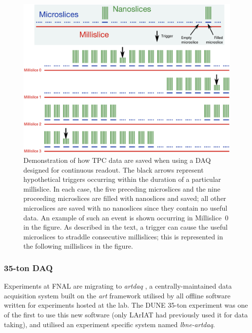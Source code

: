 \begin{figure}
  \centering
  \includegraphics[width=16cm]{triggered_event.eps}
  \caption[Demonstration of how TPC data from a triggered event in a LArTPC is saved when employing a DAQ with continuous readout.]{Demonstration of how TPC data are saved when using a DAQ designed for continuous readout.  The black arrows represent hypothetical triggers occurring within the duration of a particular millislice.  In each case, the five preceding microslices and the nine proceeding microslices are filled with nanoslices and saved; all other microslices are saved with no nanoslices since they contain no useful data.  An example of such an event is shown occurring in Millislice~0 in the figure.  As described in the text, a trigger can cause the useful microslices to straddle consecutive millislices; this is represented in the following millislices in the figure.}
  \label{fig:35tonTriggeredEvent}
\end{figure}

\subsubsection{35-ton DAQ}\label{sec:35tonDAQ}

Experiments at FNAL are migrating to \textit{artdaq} \cite{Biery2013}, a centrally-maintained data acquisition system built on the \textit{art} \cite{artWebsite,art2012} framework utilised by all offline software written for experiments hosted at the lab.  The DUNE 35-ton experiment was one of the first to use this new software (only LArIAT had previously used it for data taking), and utilised an experiment specific system named \textit{lbne-artdaq}.

